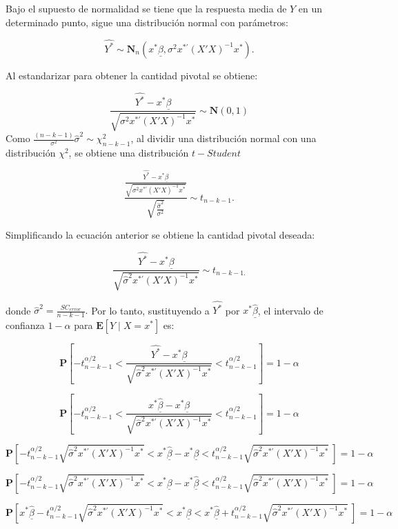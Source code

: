 \documentclass[
  a4paper,
  oneside,
  openany]{book}
\begin{document}
Bajo el supuesto de normalidad se tiene que la respuesta media de \(Y\) en un determinado punto, sigue una distribución normal con parámetros:

\[\hat{Y^*} \sim \mathbf{N}_{n}\left(x^*\underline{\beta} ,\sigma^2 x^{*'}(X'X)^{-1}x^*\right).\]

Al estandarizar para obtener la cantidad pivotal se obtiene:

\[\frac{\hat{Y^*}-x^*\underline{\beta}}{\sqrt{\sigma^2 x^{*'}(X'X)^{-1}x^*}}\sim \mathbf{N}(0,1)\]
Como \(\frac{(n-k-1)}{\sigma^2}\hat{\sigma}^2 \sim \chi^2_{n-k-1}\), al dividir una distribución normal con una distribución \(\chi^2\), se obtiene una distribución \(t-Student\)

\[\frac{\frac{\hat{Y^*}-x^*\underline{\beta}}{\sqrt{\sigma^2 x^{*'}(X'X)^{-1}x^*}}}{\sqrt{\frac{\hat{\sigma}^2}{\sigma^2}}} \sim t_{n-k-1}.\]

Simplificando la ecuación anterior se obtiene la cantidad pivotal deseada:

\[\frac{\hat{Y^*}-x^*\underline{\beta}}{\sqrt{\hat{\sigma}^2 x^{*'}(X'X)^{-1}x^*}}\sim t_{n-k-1.}\]

donde \(\hat{\sigma}^2=\frac{SC_{error}}{n-k-1}.\) Por lo tanto, sustituyendo a \(\hat{Y^*}\) por \(x^*\underline{\hat{\beta}}\), el intervalo de confianza \(1-\alpha\) para \(\mathbf{E}[Y \mid X=x^*]\) es:

\[\mathbf{P}\left[ -t^{\alpha/2}_{n-k-1}<\frac{\hat{Y^*}-x^*\underline{\beta}}{\sqrt{\hat{\sigma}^2 x^{*'}(X'X)^{-1}x^*}}  <t^{\alpha/2}_{n-k-1}\right]=1-\alpha\]

\[\mathbf{P}\left[ -t^{\alpha/2}_{n-k-1}<\frac{x^*\underline{\hat{\beta}}-x^*\underline{\beta}}{\sqrt{\hat{\sigma}^2 x^{*'}(X'X)^{-1}x^*}}  <t^{\alpha/2}_{n-k-1}\right]=1-\alpha\]

\[\mathbf{P}\left[ -t^{\alpha/2}_{n-k-1}\sqrt{\hat{\sigma}^2 x^{*'}(X'X)^{-1}x^*}<x^*\underline{\hat{\beta}}-x^*\underline{\beta}  <t^{\alpha/2}_{n-k-1}\sqrt{\hat{\sigma}^2 x^{*'}(X'X)^{-1}x^*} \ \right]=1-\alpha\]

\[\mathbf{P}\left[ -t^{\alpha/2}_{n-k-1}\sqrt{\hat{\sigma}^2 x^{*'}(X'X)^{-1}x^*}<x^*\underline{\beta}-x^*\underline{\hat{\beta}}  <t^{\alpha/2}_{n-k-1}\sqrt{\hat{\sigma}^2 x^{*'}(X'X)^{-1}x^*} \ \right]=1-\alpha\]

\[\mathbf{P}\left[ x^*\underline{\hat{\beta}}-t^{\alpha/2}_{n-k-1}\sqrt{\hat{\sigma}^2 x^{*'}(X'X)^{-1}x^*}<x^*\underline{\beta}  <x^*\underline{\hat{\beta}}+t^{\alpha/2}_{n-k-1}\sqrt{\hat{\sigma}^2 x^{*'}(X'X)^{-1}x^*} \ \right]=1-\alpha\]
\end{document}
